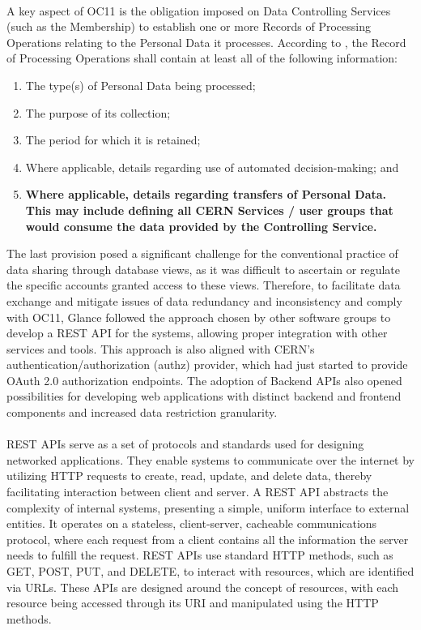\paragraph{} A key aspect of OC11 is the obligation imposed on Data  Controlling Services (such as the Membership) to establish one or more Records of Processing Operations relating to the Personal Data it
processes. According to \cite{cern_oc_11}, the Record of Processing Operations shall contain at least all of the following information:
\begin{enumerate}
    \item The type(s) of Personal Data being processed;
    \item The purpose of its collection;
    \item The period for which it is retained;
    \item Where applicable, details regarding use of automated decision-making; and
    \item \textbf{Where applicable, details regarding transfers of Personal Data. This may include defining all CERN Services / user groups that would consume the data provided by the Controlling Service.}
\end{enumerate} 

The last provision posed a significant challenge for the conventional practice of data sharing through database views, as it was difficult to ascertain or regulate the specific accounts granted access to these views. Therefore, to facilitate data exchange and mitigate issues of data redundancy and inconsistency and comply with OC11, Glance followed the approach chosen by other software groups to develop a REST API for the systems, allowing proper integration with other services and tools. This approach is also aligned with CERN's authentication/authorization (authz) provider, which had just started to provide OAuth 2.0 authorization endpoints. The adoption of Backend APIs also opened possibilities for developing web applications with distinct backend and frontend components and increased data restriction granularity.

\paragraph{} REST APIs serve as a set of protocols and standards used for designing networked applications. They enable systems to communicate over the internet by utilizing HTTP requests to create, read, update, and delete data, thereby facilitating interaction between client and server. A REST API abstracts the complexity of internal systems, presenting a simple, uniform interface to external entities. It operates on a stateless, client-server, cacheable communications protocol, where each request from a client contains all the information the server needs to fulfill the request. REST APIs use standard HTTP methods, such as GET, POST, PUT, and DELETE, to interact with resources, which are identified via URLs. These APIs are designed around the concept of resources, with each resource being accessed through its URI and manipulated using the HTTP methods. 

